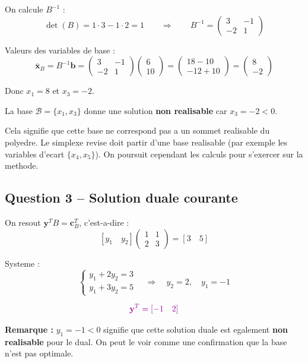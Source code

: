 \documentclass[12pt,a4paper]{article}
\begin{document}
\begin{correction}
On calcule $B^{-1}$ :
$$\det(B) = 1\cdot 3 - 1\cdot 2 = 1 \qquad \Rightarrow \qquad B^{-1} = \begin{pmatrix}3 & -1\\-2 & 1\end{pmatrix}$$

Valeurs des variables de base :
$$\bar{\mathbf{x}}_B = B^{-1}\mathbf{b} = \begin{pmatrix}3 & -1\\-2 & 1\end{pmatrix}\begin{pmatrix}6\\10\end{pmatrix} = \begin{pmatrix}18-10\\-12+10\end{pmatrix} = \begin{pmatrix}8\\-2\end{pmatrix}$$

Donc $x_1 = 8$ et $x_3 = -2$.

\begin{important}
La base $\mathcal{B} = \{x_1, x_3\}$ donne une solution \textcolor{importantrouge}{\textbf{non realisable}} car $x_3 = -2 < 0$.

Cela signifie que cette base ne correspond pas a un sommet realisable du polyedre. Le simplexe revise doit partir d'une base realisable (par exemple les variables d'ecart $\{x_4, x_5\}$). On poursuit cependant les calculs pour s'exercer sur la methode.
\end{important}
\end{correction}

\subsection{Question 3 -- Solution duale courante}

\begin{correction}
On resout $\mathbf{y}^T B = \mathbf{c}_B^T$, c'est-a-dire :
$$[y_1 \quad y_2]\begin{pmatrix}1 & 1\\2 & 3\end{pmatrix} = [3 \quad 5]$$

Systeme :
$$\begin{cases} y_1 + 2y_2 = 3\\ y_1 + 3y_2 = 5 \end{cases} \quad \Rightarrow \quad y_2 = 2, \quad y_1 = -1$$

$$\textcolor{algoviolet}{\mathbf{y}^T = [-1 \quad 2]}$$

\textbf{Remarque :} $y_1 = -1 < 0$ signifie que cette solution duale est egalement \textcolor{importantrouge}{\textbf{non realisable}} pour le dual. On peut le voir comme une confirmation que la base n'est pas optimale.
\end{correction}
\end{document}
